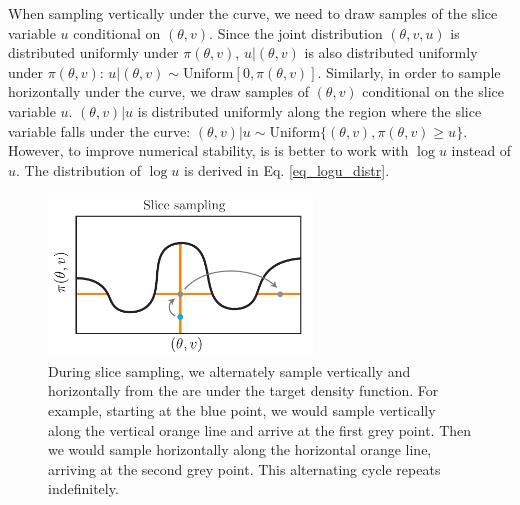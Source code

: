 \documentclass[12pt]{article}
\begin{document}
When sampling vertically under the curve, we need to draw samples of the slice variable $u$ conditional on $(\theta, v)$. Since the joint distribution $(\theta, v, u)$ is distributed uniformly under $\pi(\theta, v)$, $u|(\theta, v)$ is also distributed uniformly under $\pi(\theta, v)$: $u|(\theta, v) \sim \text{Uniform}[0, \pi(\theta, v)]$. Similarly, in order to sample horizontally under the curve, we draw samples of $(\theta, v)$ conditional on the slice variable $u$. $(\theta, v)|u$ is distributed uniformly along the region where the slice variable falls under the curve: $(\theta, v) | u \sim \text{Uniform}\{(\theta, v), \pi(\theta, v) \geq u\}$. However, to improve numerical stability, is is better to work with $\log u$ instead of $u$. The distribution of $\log u$ is derived in Eq. \ref{eq_logu_distr}.

\begin{figure}[H]
\centering
\includegraphics[width=7cm]{illustrations/slice_sampling.pdf}
\caption{During slice sampling, we alternately sample vertically and horizontally from the are under the target density function. For example, starting at the blue point, we would sample vertically along the vertical orange line and arrive at the first grey point. Then we would sample horizontally along the horizontal orange line, arriving at the second grey point. This alternating cycle repeats indefinitely.}
\label{fig_slice_sampling}
\end{figure}
\end{document}
